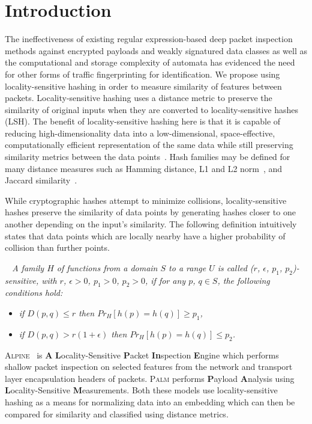 \section{Introduction}
The ineffectiveness of existing regular expression-based deep packet inspection methods against encrypted payloads and weakly signatured data classes as well as the computational and storage complexity of automata has evidenced the need for other forms of traffic fingerprinting for identification. We propose using locality-sensitive hashing in order to measure similarity of features between packets. Locality-sensitive hashing uses a distance metric to preserve the similarity of original inputs when they are converted to locality-sensitive hashes (LSH). The benefit of locality-sensitive hashing here is that it is capable of reducing high-dimensionality data into a low-dimensional, space-effective, computationally efficient representation of the same data while still preserving similarity metrics between the data points~\cite{jafari2021survey}. Hash families may be defined for many distance measures such as Hamming distance, L1 and L2 norm~\cite{ANN-CoD}, and Jaccard similarity~\cite{minhash}.

While cryptographic hashes attempt to minimize collisions, locality-sensitive hashes preserve the similarity of data points by generating hashes closer to one another depending on the input's similarity. The following definition intuitively states that data points which are locally nearby have a higher probability of collision than further points.

\medskip

\begin{definition}
\textit{~\cite{lshforest} A family $H$ of functions from a domain $S$ to a range $U$ is called ($r$, $\epsilon$, $p_1$, $p_2$)-sensitive, with $r$, $\epsilon > 0$, $p_1 > 0$, $p_2 > 0$, if for any $p$, $q \in S$, the following conditions hold:}
\begin{itemize}
\item{\textit{if $D(p, q) \leq r$ then $Pr_H[h(p) = h(q)] \geq p_1$,}}
\item{\textit{if $D(p, q) > r(1 + \epsilon)$ then $Pr_H[h(p) = h(q)] \leq p_2$.}}
\end{itemize}
\end{definition}

\medskip

\textsc{Alpine}~\cite{alpinepalm} is \textbf{A} \textbf{L}ocality-Sensitive \textbf{P}acket \textbf{In}spection \textbf{E}ngine which performs shallow packet inspection on selected features from the network and transport layer encapsulation headers of packets. \textsc{Palm} performs \textbf{P}ayload \textbf{A}nalysis using \textbf{L}ocality-Sensitive \textbf{M}easurements. Both these models use locality-sensitive hashing as a means for normalizing data into an embedding which can then be compared for similarity and classified using distance metrics.

